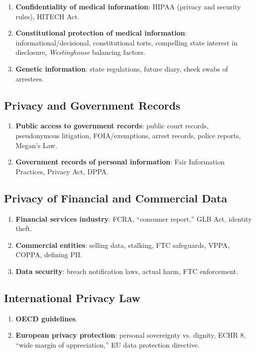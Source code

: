 \begin{enumerate}
    \item \textbf{Confidentiality of medical information}: HIPAA (privacy and 
    security rules), HITECH Act.
    \item \textbf{Constitutional protection of medical information}: 
    informational/decisional, constitutional torts, compelling state interest 
    in disclosure, \emph{Westinghouse} balancing factors.
    \item \textbf{Genetic information}: state regulations, future diary, cheek 
    swabs of arrestees.
\end{enumerate}

\subsection{Privacy and Government Records}

\begin{enumerate}
    \item \textbf{Public access to government records}: public court records, 
    pseudonymous litigation, FOIA/exemptions, arrest records, police reports, 
    Megan's Law.
    \item \textbf{Government records of personal information}: Fair 
    Information Practices, Privacy Act, DPPA.
\end{enumerate}

\subsection{Privacy of Financial and Commercial Data}

\begin{enumerate}
    \item \textbf{Financial services industry}: FCRA, ``consumer report,'' GLB 
    Act, identity theft.
    \item \textbf{Commercial entities}: selling data, stalking, FTC 
    safeguards, VPPA, COPPA, defining PII.
    \item \textbf{Data security}: breach notification laws, actual harm, FTC 
    enforcement.
\end{enumerate}

\subsection{International Privacy Law}

\begin{enumerate}
    \item \textbf{OECD guidelines}.
    \item \textbf{European privacy protection}: personal sovereignty vs. 
    dignity, ECHR 8, ``wide margin of appreciation,'' EU data protection 
    directive.
\end{enumerate}
